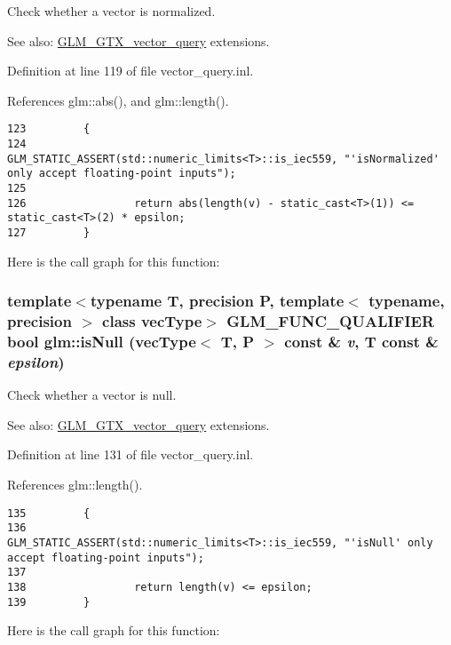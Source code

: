 Check whether a vector is normalized. \begin{Desc}
\item[See also:]\hyperlink{group__gtx__vector__query}{GLM\_\-GTX\_\-vector\_\-query} extensions. \end{Desc}


Definition at line 119 of file vector\_\-query.inl.

References glm::abs(), and glm::length().

\begin{Code}\begin{verbatim}123         {
124                 GLM_STATIC_ASSERT(std::numeric_limits<T>::is_iec559, "'isNormalized' only accept floating-point inputs");
125 
126                 return abs(length(v) - static_cast<T>(1)) <= static_cast<T>(2) * epsilon;
127         }
\end{verbatim}
\end{Code}




Here is the call graph for this function:\hypertarget{group__gtx__vector__query_g368e458df5a70d885f5d8a87ec7b8ef8}{
\subsubsection[isNull]{\setlength{\rightskip}{0pt plus 5cm}template$<$typename T, precision P, template$<$ typename, precision $>$ class vecType$>$ GLM\_\-FUNC\_\-QUALIFIER bool glm::isNull (vecType$<$ T, P $>$ const \& {\em v}, \/  T const \& {\em epsilon})}}
\label{group__gtx__vector__query_g368e458df5a70d885f5d8a87ec7b8ef8}


Check whether a vector is null. \begin{Desc}
\item[See also:]\hyperlink{group__gtx__vector__query}{GLM\_\-GTX\_\-vector\_\-query} extensions. \end{Desc}


Definition at line 131 of file vector\_\-query.inl.

References glm::length().

\begin{Code}\begin{verbatim}135         {
136                 GLM_STATIC_ASSERT(std::numeric_limits<T>::is_iec559, "'isNull' only accept floating-point inputs");
137 
138                 return length(v) <= epsilon;
139         }
\end{verbatim}
\end{Code}




Here is the call graph for this function: